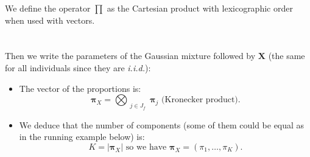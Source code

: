 \documentclass[12pt,a4paper]{report}
\begin{document}
We define the operator $\prod$ as the Cartesian product with lexicographic order when used with vectors. \\
\\
	\\
	
	Then we write the parameters of the Gaussian mixture followed by $\boldsymbol{X}$ (the same for all individuals since they are {\it i.i.d.}):
\begin{itemize}
	\item The vector of the proportions is:
	\begin{equation}
		\boldsymbol{\pi}_X=\bigotimes_{\substack{j \in J_f }} \boldsymbol{\pi}_j \textrm{ (Kronecker product)}.  \nonumber 
	\end{equation}
	\item We deduce that the number of components (some of them could be equal as in the running example below) is:
	\begin{equation}
		K=|\boldsymbol{\pi}_X| \textrm{ so we have } \boldsymbol{\pi}_X=(\pi_1,\dots,\pi_K). \nonumber 
	\end{equation}
	\end{itemize}
\end{document}
